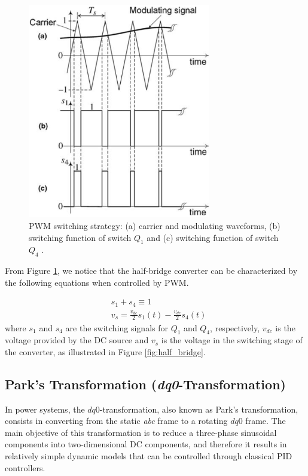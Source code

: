 \newpage
\begin{figure}[ht!]
    \centering
    \includegraphics[width=8cm]{images/pwm.png}
    \caption{PWM switching strategy: (a) carrier and modulating waveforms, (b)
    switching function of switch $Q_1$ and (c) switching function of switch
    $Q_4$ \cite{yazdani2010voltage}.}
    \label{fig:pwm}
\end{figure}

From Figure \ref{fig:pwm}, we notice that the half-bridge converter can be
characterized by the following equations when controlled by PWM.

\begin{equation}\label{eq:v_s}
    \begin{aligned}
        &s_1 + s_4 \equiv 1\\
        &v_s = \frac{v_{dc}}{2} s_1(t) - \frac{v_{dc}}{2} s_4(t)
    \end{aligned}
\end{equation}
\noindent where $s_1$ and $s_4$ are the switching signals for $Q_1$ and $Q_4$,
respectively, $v_{dc}$ is the voltage provided by the DC source and $v_s$ is the
voltage in the switching stage of the converter, as illustrated in Figure
\ref{fig:half_bridge}.

\subsection{Park's Transformation (\textit{dq0}-Transformation)}\label{subsection:park}

In power systems, the $dq0$-transformation, also known as Park's transformation,
consists in converting from the static \textit{abc} frame to a rotating $dq0$
frame. The main objective of this transformation is to reduce a three-phase
sinusoidal components into two-dimensional DC components, and therefore it
results in relatively simple dynamic models that can be controlled through
classical PID controllers.

